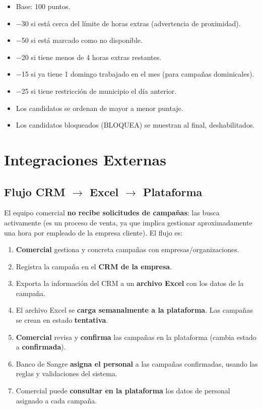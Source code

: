 \documentclass[10pt,a4paper]{article}
\begin{document}
\begin{itemize}[leftmargin=2em]
    \item Base: 100 puntos.
    \item $-$30 si est\'{a} cerca del l\'{i}mite de horas extras (advertencia de proximidad).
    \item $-$50 si est\'{a} marcado como no disponible.
    \item $-$20 si tiene menos de 4 horas extras restantes.
    \item $-$15 si ya tiene 1 domingo trabajado en el mes (para campañas dominicales).
    \item $-$25 si tiene restricci\'{o}n de municipio el d\'{i}a anterior.
    \item Los candidatos se ordenan de mayor a menor puntaje.
    \item Los candidatos bloqueados (BLOQUEA) se muestran al final, deshabilitados.
\end{itemize}

\section{Integraciones Externas}

\subsection{Flujo CRM $\rightarrow$ Excel $\rightarrow$ Plataforma}

El equipo comercial \textbf{no recibe solicitudes de campañas}: las busca activamente (es un proceso de venta, ya que implica gestionar aproximadamente una hora por empleado de la empresa cliente). El flujo es:

\begin{enumerate}[leftmargin=2em]
    \item \textbf{Comercial} gestiona y concreta campañas con empresas/organizaciones.
    \item Registra la campaña en el \textbf{CRM de la empresa}.
    \item Exporta la informaci\'{o}n del CRM a un \textbf{archivo Excel} con los datos de la campaña.
    \item El archivo Excel se \textbf{carga semanalmente a la plataforma}. Las campañas se crean en estado \textbf{tentativa}.
    \item \textbf{Comercial} revisa y \textbf{confirma} las campañas en la plataforma (cambia estado a \textbf{confirmada}).
    \item Banco de Sangre \textbf{asigna el personal} a las campañas confirmadas, usando las reglas y validaciones del sistema.
    \item Comercial puede \textbf{consultar en la plataforma} los datos de personal asignado a cada campaña.
\end{enumerate}
\end{document}
